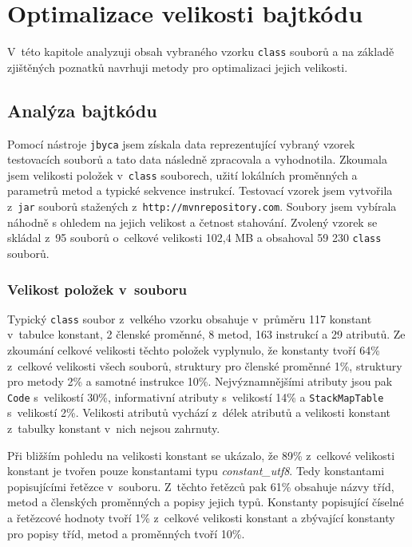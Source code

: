 \chapter{Optimalizace velikosti bajtkódu}\label{Optimization}

V~této kapitole analyzuji obsah vybraného vzorku \texttt{class} souborů a na základě zjištěných poznatků navrhuji metody pro optimalizaci jejich velikosti. 

\section{Analýza bajtkódu}\label{Optimization:Analysis}

Pomocí nástroje \texttt{jbyca} jsem získala data reprezentující vybraný vzorek testovacích souborů a tato data následně zpracovala a vyhodnotila. Zkoumala jsem velikosti položek v~\texttt{class} souborech, užití lokálních proměnných a parametrů metod a typické sekvence instrukcí. Testovací vzorek jsem vytvořila z~\texttt{jar} souborů stažených z~\texttt{http://mvnrepository.com}. Soubory jsem vybírala náhodně s ohledem na jejich velikost a četnost stahování. Zvolený vzorek se skládal z~95 souborů o~celkové velikosti 102,4 MB a obsahoval 59 230 \texttt{class} souborů.

\subsection{Velikost položek v~souboru}

Typický \texttt{class} soubor z~velkého vzorku obsahuje v~průměru 117 konstant v~tabulce konstant, 2 členské proměnné, 8 metod, 163 instrukcí a 29 atributů. Ze zkoumání celkové velikosti těchto položek vyplynulo, že konstanty tvoří 64\% z~celkové velikosti všech souborů, struktury pro členské proměnné 1\%, struktury pro metody 2\% a samotné instrukce 10\%.
Nejvýznamnějšími atributy jsou pak \texttt{Code} s~velikostí 30\%, informativní atributy s~velikostí 14\% a \texttt{StackMapTable} s~velikostí 2\%. Velikosti atributů vychází z~délek atributů a velikosti konstant z~tabulky konstant v~nich nejsou zahrnuty.

Při bližším pohledu na velikosti konstant se ukázalo, že 89\% z~celkové velikosti konstant je tvořen pouze konstantami typu \textit{constant\_utf8}. Tedy konstantami popisujícími řetězce v~souboru. Z~těchto řetězců pak 61\% obsahuje názvy tříd, metod a členských proměnných a popisy jejich typů. Konstanty popisující číselné a řetězcové hodnoty tvoří 1\% z~celkové velikosti konstant a zbývající konstanty pro popisy tříd, metod a proměnných tvoří 10\%.

